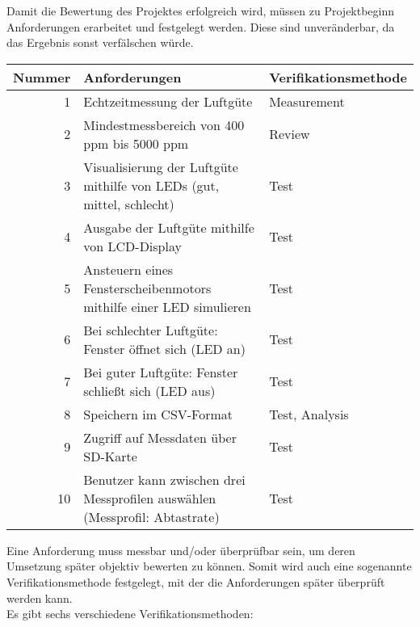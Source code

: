 \label{Anforderungen}

Damit die Bewertung des Projektes erfolgreich wird, müssen zu Projektbeginn Anforderungen erarbeitet und festgelegt werden. Diese sind unveränderbar, da das Ergebnis sonst verfälschen würde.

\begin{table}[!hbt]
	
	\centering
	
	\begin{tabular}{|r| p{8.4cm}|p{4.7cm}|}
		
		\hline
		Nummer & Anforderungen & Verifikationsmethode \\
		\hline
		1 & Echtzeitmessung der Luftgüte & Measurement \\
		\hline
		2 & Mindestmessbereich von 400 ppm bis 5000 ppm & Review \\
		\hline
		3 & Visualisierung der Luftgüte mithilfe von LEDs (gut, mittel, schlecht) & Test \\
		\hline
		4 & Ausgabe der Luftgüte mithilfe von \ac{LCD}-Display & Test \\
		\hline
		5 & Ansteuern eines Fensterscheibenmotors mithilfe einer LED simulieren & Test \\
		\hline
		6 & Bei schlechter Luftgüte: Fenster öffnet sich (LED an) & Test \\
		\hline
		7 & Bei guter Luftgüte: Fenster schließt sich (LED aus) & Test \\
		\hline
		8 & Speichern im CSV-Format & Test, Analysis\\
		\hline
		9 & Zugriff auf Messdaten über SD-Karte & Test \\
		\hline
		10 & Benutzer kann zwischen drei Messprofilen auswählen (Messprofil: Abtastrate) & Test \\
		\hline
		
	\end{tabular}

\label{tab:Anforderungen}

\end{table}

Eine Anforderung muss messbar und/oder überprüfbar sein, um deren Umsetzung später objektiv bewerten zu können. Somit wird auch eine sogenannte Verifikationsmethode festgelegt, mit der die Anforderungen später überprüft werden kann. \\
Es gibt sechs verschiedene Verifikationsmethoden:

